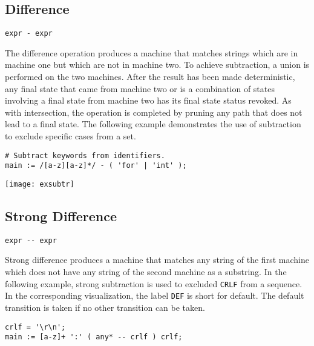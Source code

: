\documentclass[letterpaper,11pt,oneside]{book}
\newcommand{\verbspace}{\vspace{10pt}}
\newcommand{\graphspace}{\vspace{10pt}}
\newenvironment{inline_code}{\def\baselinestretch{1}\vspace{12pt}\small}{}
\begin{document}
\subsection{Difference}

\verb|expr - expr|
\verbspace

The difference operation produces a machine that matches
strings which are in machine one but which are not in machine two. To achieve subtraction,
a union is performed on the two machines. After the result has been made
deterministic, any final state that came from machine two or is a combination
of states involving a final state from machine two has its final state status
revoked. As with intersection, the operation is completed by pruning any path
that does not lead to a final state.  The following example demonstrates the
use of subtraction to exclude specific cases from a set.

\verbspace

% GENERATE: exsubtr
\begin{inline_code}
\begin{verbatim}
# Subtract keywords from identifiers.
main := /[a-z][a-z]*/ - ( 'for' | 'int' );
\end{verbatim}
\end{inline_code}

\graphspace
\begin{center}
\texttt{[image: exsubtr]}
\end{center}
\graphspace


\subsection{Strong Difference}
\label{strong_difference}

\verb|expr -- expr|
\verbspace

Strong difference produces a machine that matches any string of the first
machine which does not have any string of the second machine as a substring. In
the following example, strong subtraction is used to excluded \verb|CRLF| from
a sequence. In the corresponding visualization, the label \verb|DEF| is short
for default. The default transition is taken if no other transition can be
taken.

\begin{inline_code}
\begin{verbatim}
crlf = '\r\n';
main := [a-z]+ ':' ( any* -- crlf ) crlf;
\end{verbatim}
\end{inline_code}
\end{document}
